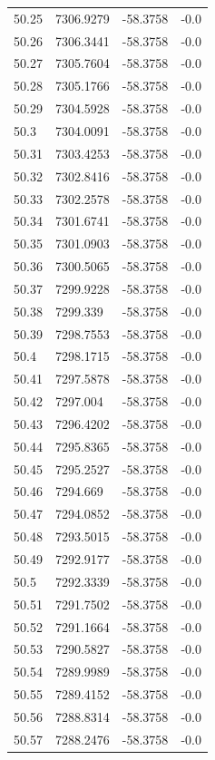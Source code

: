 \begin{table}[H]
\begin{tabular}{llll}
50.25 & 7306.9279 & -58.3758 & -0.0 \\
50.26 & 7306.3441 & -58.3758 & -0.0 \\
50.27 & 7305.7604 & -58.3758 & -0.0 \\
50.28 & 7305.1766 & -58.3758 & -0.0 \\
50.29 & 7304.5928 & -58.3758 & -0.0 \\
50.3 & 7304.0091 & -58.3758 & -0.0 \\
50.31 & 7303.4253 & -58.3758 & -0.0 \\
50.32 & 7302.8416 & -58.3758 & -0.0 \\
50.33 & 7302.2578 & -58.3758 & -0.0 \\
50.34 & 7301.6741 & -58.3758 & -0.0 \\
50.35 & 7301.0903 & -58.3758 & -0.0 \\
50.36 & 7300.5065 & -58.3758 & -0.0 \\
50.37 & 7299.9228 & -58.3758 & -0.0 \\
50.38 & 7299.339 & -58.3758 & -0.0 \\
50.39 & 7298.7553 & -58.3758 & -0.0 \\
50.4 & 7298.1715 & -58.3758 & -0.0 \\
50.41 & 7297.5878 & -58.3758 & -0.0 \\
50.42 & 7297.004 & -58.3758 & -0.0 \\
50.43 & 7296.4202 & -58.3758 & -0.0 \\
50.44 & 7295.8365 & -58.3758 & -0.0 \\
50.45 & 7295.2527 & -58.3758 & -0.0 \\
50.46 & 7294.669 & -58.3758 & -0.0 \\
50.47 & 7294.0852 & -58.3758 & -0.0 \\
50.48 & 7293.5015 & -58.3758 & -0.0 \\
50.49 & 7292.9177 & -58.3758 & -0.0 \\
50.5 & 7292.3339 & -58.3758 & -0.0 \\
50.51 & 7291.7502 & -58.3758 & -0.0 \\
50.52 & 7291.1664 & -58.3758 & -0.0 \\
50.53 & 7290.5827 & -58.3758 & -0.0 \\
50.54 & 7289.9989 & -58.3758 & -0.0 \\
50.55 & 7289.4152 & -58.3758 & -0.0 \\
50.56 & 7288.8314 & -58.3758 & -0.0 \\
50.57 & 7288.2476 & -58.3758 & -0.0 \\

\end{tabular}
\end{table}
